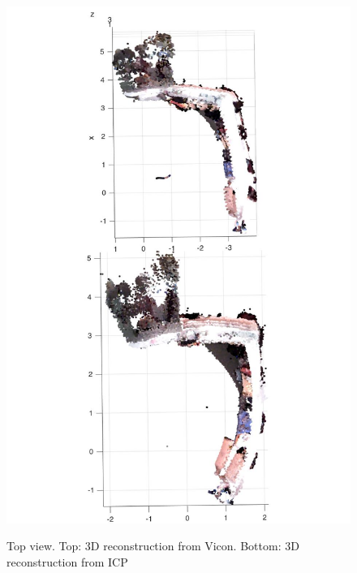 \documentclass[letterpaper, 10 pt, conference]{ieeeconf}  %
\begin{document}
\begin{figure}
\centering
\includegraphics[width=\columnwidth]{viconicp_top.jpg}\\
\caption{Top view. Top: 3D reconstruction from Vicon. Bottom: 3D reconstruction from ICP}
\label{fig:viconicp_side}
\end{figure}
\end{document}
